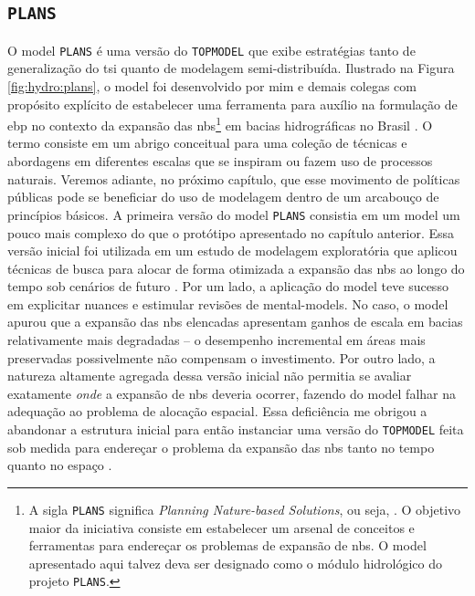 \documentclass[./main.tex]{subfiles}
\begin{document}
\subsection{\texttt{PLANS}} \label{sec:hydro:plans}

\par O \gls{model} \texttt{PLANS} é uma versão do \texttt{TOPMODEL} que exibe estratégias tanto de generalização do \gls{tsi} quanto de modelagem semi-distribuída. Ilustrado na Figura \ref{fig:hydro:plans}, o \gls{model} foi desenvolvido por mim e demais colegas com propósito explícito de estabelecer uma ferramenta para auxílio na formulação de \gls{ebp} no contexto da expansão das \acrfull{nbs}\footnote{A sigla \texttt{PLANS} significa \textit{Planning Nature-based Solutions}, ou seja, . O objetivo maior da iniciativa consiste em estabelecer um arsenal de conceitos e ferramentas para endereçar os problemas de expansão de \acrshort{nbs}. O \gls{model} apresentado aqui talvez deva ser designado como o módulo hidrológico do projeto \texttt{PLANS}.} em bacias hidrográficas no Brasil \cite{Possantti2022a, Possantti2023a}. O termo  consiste em um abrigo conceitual para uma coleção de técnicas e abordagens em diferentes escalas que se inspiram ou fazem uso de processos naturais. Veremos adiante, no próximo capítulo, que esse movimento de políticas públicas pode se beneficiar do uso de modelagem dentro de um arcabouço de princípios básicos. A primeira versão do \gls{model} \texttt{PLANS} consistia em um \gls{model} um pouco mais complexo do que o protótipo apresentado no capítulo anterior. Essa versão inicial foi utilizada em um estudo de modelagem exploratória que aplicou técnicas de busca para alocar de forma otimizada a expansão das \acrshort{nbs} ao longo do tempo sob cenários de futuro \cite{Possantti2022a}. Por um lado, a aplicação do \gls{model} teve sucesso em explicitar nuances e estimular revisões de \gls{mental-models}. No caso, o \gls{model} apurou que a expansão das \acrshort{nbs} elencadas apresentam ganhos de escala em bacias relativamente mais degradadas -- o desempenho incremental em áreas mais preservadas possivelmente não compensam o investimento. Por outro lado, a natureza altamente agregada dessa versão inicial não permitia se avaliar exatamente \textit{onde} a expansão de \acrshort{nbs} deveria ocorrer, fazendo do \gls{model} falhar na adequação ao problema de alocação espacial. Essa deficiência me obrigou a abandonar a estrutura inicial para então instanciar uma versão do \texttt{TOPMODEL} feita sob medida para endereçar o problema da expansão das \acrshort{nbs} tanto no tempo quanto no espaço \cite{Possantti2023a}.     
\end{document}

